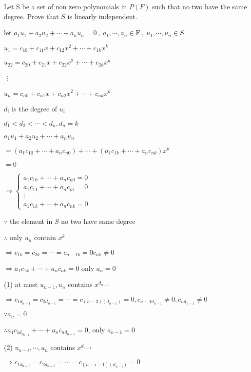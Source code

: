 Let S be a set of non zero polynomials in $P(F)$ such that no two have the same degree. Prove that $S$ is linearly independent.

\begin{tcolorbox}
	\begin{solution}
		let $a_1u_1+a_2u_2+\cdots+a_nu_n=0~,~a_1,\cdots,a_n \in \mathrm{F}~,~u_1,\cdots,u_n \in S$
		
		$u_1 = c_{10} + c_{11}x + c_{12}x^2 + \cdots + c_{1k}x^k$
		
		$u_22 = c_{20} + c_{21}x + c_{22}x^2 + \cdots + c_{2k}x^k$
		
		\vdots		
		
		$u_n = c_{n0} + c_{n1}x + c_{n2}x^2 + \cdots + c_{nk}x^k$
		
		$d_i $ is the degree of $u_i$
		
		$d_1 < d_2 < \cdots < d_n ,d_n= k$
		
		$a_1u_1 + a_2u_2 + \cdots + a_nu_n$
		
		$=(a_1c_{10}+\cdots + a_nc_{n0})+\cdots+(a_1c_{1k}+\cdots + a_nc_{nk})x^k$
		
		$=0$
		
		$\Rightarrow 
		\begin{cases}
			a_1c_{10}+\cdots+a_nc_{n0} = 0\\
			a_1c_{11}+\cdots+a_nc_{n1} = 0\\
			\vdots \\
			a_1c_{1k}+\cdots+a_nc_{nk} = 0
		\end{cases}$
		
		$\because $ the element in $S$ no two have same degree
		
		$\therefore$ only $u_n$ contain $x^k$
		
		$\Rightarrow c_{1k} = c_{2k} = \cdots = c_{n-1k} = 0 c_{nk} \neq 0$
		
		$\Rightarrow a_1c_{1k} + \cdots + a_nc_{nk} = 0$ only $a_n = 0$
		
		(1) at most $u_{n-1},u_n$ contains $x^{d_{n-1}}$
		
		$\Rightarrow c_{1d_{n-1}} = c_{2d_{n-1}} = \cdots = c_{(n-2)(d_{n-1})} = 0, c_{n-1d_{n-1}}\neq 0, c_{nd_{n-1}} \neq 0$
		
		$\because a_n = 0$
		
		$\therefore a_1c_{1d_{d_{n-1}}} + \cdots + a_nc_{nd_{n-1}} = 0$, only $a_{n-1} = 0$
		
		(2) $u_{n-i}, \cdots, u_n$ contains $x^{d_{n-i}}$
		
		$\Rightarrow c_{1d_{n-i}} = c_{2d_{n-i}} = \cdots = c_{(n-i-1)(d_{n-i})} = 0$
		

\end{solution}
\end{tcolorbox}
